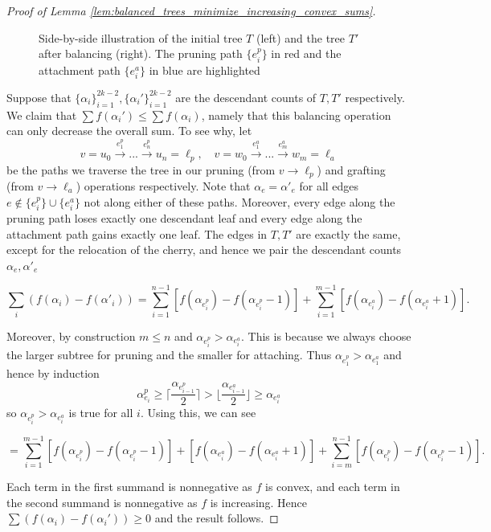 \documentclass[10pt,oneside,reqno]{article}
\theoremstyle{plain}
\theoremstyle{definition}
\numberwithin{equation}{section}
\renewcommand{\leq}{\leqslant}
\renewcommand{\geq}{\geqslant}
\begin{document}
\begin{proof}[Proof of Lemma \ref{lem:balanced_trees_minimize_increasing_convex_sums}]
\begin{figure}[h]
\begin{minipage}{0.48\textwidth}
\begin{tikzpicture}[scale=0.7]
\end{tikzpicture}
\end{minipage}

\caption{Side-by-side illustration of the initial tree $T$ (left) and the tree $T'$ after balancing (right). The pruning path $\{e_i^p\}$ in red and the attachment path $\{e_i^a\}$ in blue are highlighted}
\label{fig:balancing_algorithm_trees}
\end{figure}


Suppose that $\{\alpha_i\}_{i=1}^{2k-2}, \{\alpha_i'\}_{i=1}^{2k-2}$ are the descendant counts of $T, T'$ respectively. We claim that $\sum f(\alpha_i') \leq \sum f(\alpha_i)$, namely that this balancing operation can only decrease the overall sum. To see why, let
%
\[v = u_0 \xrightarrow{e^p_1} ... \xrightarrow{e^p_n} u_n = \ell_p, \quad v = w_0 \xrightarrow{e^a_1} ... \xrightarrow{e^a_m} w_m = \ell_a\]
%
\noindent be the paths we traverse the tree in our pruning (from $v \to \ell_p$) and grafting (from $v \to \ell_a$) operations respectively. Note that $\alpha_e = \alpha'_e$ for all edges $e \notin \{e_i^p\} \cup \{e_i^a\}$ not along either of these paths. Moreover, every edge along the pruning path loses exactly one descendant leaf and every edge along the attachment path gains exactly one leaf.  The edges in $T,T'$ are exactly the same, except for the relocation of the cherry, and hence we pair the descendant counts $\alpha_e, \alpha'_e$

\[\sum_i (f(\alpha_i) - f(\alpha'_i))=  \sum_{i=1}^{n-1} [f(\alpha_{e_i^p}) -  f(\alpha_{e_i^p} - 1)] + \sum_{i=1}^{m-1} [f(\alpha_{e_i^a}) -  f(\alpha_{e_i^a} + 1)].\]

\noindent Moreover,  by construction $m \leq n$ and $\alpha_{e_i^p} > \alpha_{e_i^a}$. This is because we always choose the larger subtree for pruning and the smaller for attaching. Thus $\alpha_{e_1^p} > \alpha_{e_1^a}$ and hence by induction
%
\[\alpha_{e_i}^p \geq \bigg\lceil \frac{\alpha_{e_{i-1}^p}}{2} \bigg \rceil > \bigg\lfloor \frac{\alpha_{e_{i-1}^a}}{2} \bigg \rfloor \geq \alpha_{e_i^a}\]
%
\noindent so $\alpha_{e_i^p} > \alpha_{e_i^a}$ is true for all $i$. Using this, we can see

\[= \sum_{i=1}^{m-1} [f(\alpha_{e_i^p}) -  f(\alpha_{e_i^p} - 1)] + [f(\alpha_{e_i^a}) -  f(\alpha_{e_i^a} + 1)] + \sum_{i=m}^{n-1} [f(\alpha_{e_i^p}) -  f(\alpha_{e_i^p} - 1)].\]

\noindent Each term in the first summand is nonnegative as $f$ is convex, and each term in the second summand is nonnegative as $f$ is increasing. Hence $\sum (f(\alpha_i) - f(\alpha_i')) \geq 0$ and the result follows.



\end{proof}
\end{document}
